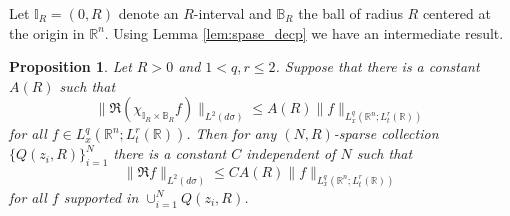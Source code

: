 \documentclass[11pt,reqno]{amsart}
\theoremstyle{plain}
\newtheorem{prop}[thm]{Proposition}
\theoremstyle{definition}
\theoremstyle{remark}
\numberwithin{equation}{section}
\begin{document}
Let $\mathbb I_R=(0,R)$ denote an $R$-interval and $\mathbb B_R$ the ball of radius $R$ centered at the origin in $\mathbb R^n$. Using Lemma \ref{lem:spase_decp} we have an intermediate result.
\begin{prop} \label{lem:sparseEst}
Let $R>0$ and $1 < q,r \leq 2$.
Suppose that there is a constant $A(R)$ such that
    \begin{equation}\label{eqn:loc_rest}
    \|\mathfrak R(\chi_{\mathbb{I}_R \times \mathbb B_R} f) \|_{L^2(d\sigma)}
    \leq A(R) \|f\|_{L_{x}^{q}(\mathbb R^n;L_{t}^{ r}(\mathbb R))}
    \end{equation}
for all $f \in L_{x}^{q}(\mathbb R^n;L_{t}^{r}(\mathbb R))$.
Then for any $(N,R)$-sparse collection $\{Q(z_i,R)\}_{i=1}^{N}$ there is a constant $C$ independent of $N$ such that
    \begin{equation}\label{eqn:loc_rest_result}
    \|\mathfrak Rf\|_{L^2(d\sigma)}
    \leq C A(R) \|f\|_{L_{x}^{q}(\mathbb R^n;L_{t}^{ r}(\mathbb R))}
    \end{equation}
for all $f$ supported in $\cup_{i=1}^{N} Q(z_i,R)$.
\end{prop}
\end{document}
